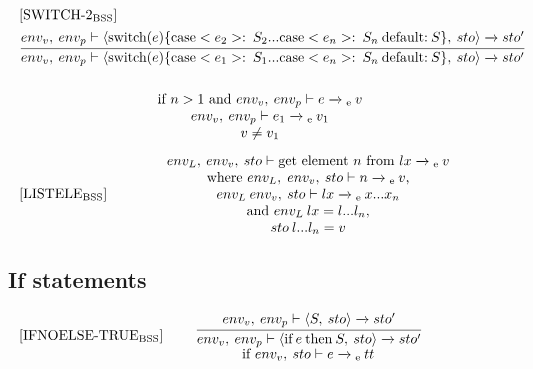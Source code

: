 \begin{equation}
\begin{split}
\begin{minipage}{\linewidth}
$[\text{SWITCH-2}_\text{BSS}]$
\end{minipage}
\\
\begin{minipage}{\linewidth}
\centering
$\cfrac
{
    env_v, \: env_p \vdash \langle  \text{switch}(e) \{\text{case} <e_2>: \: S_2 ... \text{case} <e_n>: \: S_n \: \text{default:} \: S\}, \: sto \rangle \xrightarrow{} sto'
}
{
    env_v, \: env_p \vdash \langle \text{switch}(e) \{\text{case} <e_1>: \: S_1 ... \text{case} <e_n>: \: S_n \: \text{default:} \: S\}, \: sto \rangle \xrightarrow{} sto' 
}$ 
\end{minipage}
\\\\
\begin{minipage}{\linewidth}
\centering
if $ n > 1$ and $env_v, \: env_p \vdash e \xrightarrow{}\textsubscript{e} \: v$
\\
$env_v, \: env_p \vdash e_1 \xrightarrow{}\textsubscript{e} \: v_1$
\\
$v \neq v_1$
\end{minipage}
\end{split}
\end{equation}

\begin{equation}
\begin{minipage}{.2\linewidth}
$[\text{LISTELE}_\text{BSS}]$
\end{minipage}
\begin{minipage}{.8\linewidth}
\centering
$env_L, \: env_v, \: sto \vdash \text{get element } n \text{ from } lx \xrightarrow{}\textsubscript{e} \: v$
\\
where $env_L, \; env_v, \: sto \vdash n \xrightarrow{}\textsubscript{e} \: v$, \\$env_L \: env_v, \: sto \vdash lx \xrightarrow{}\textsubscript{e} \: x...x_n$ 
\\and $env_L \: lx = l... l_n$, \\ $sto \: l...l_n = v$
\end{minipage}
\end{equation}


\subsection*{If statements}
\begin{equation}
\begin{minipage}{.2\linewidth}
$[\text{IFNOELSE-TRUE}_\text{BSS}]$
\end{minipage}
\begin{minipage}{.8\linewidth}
\centering
$\cfrac{env_v, \: env_p \vdash \langle S, \: sto\rangle \xrightarrow{} sto'}{env_v, \: env_p \vdash \langle \text{if} \: e \: \text{then} \: S, \: sto \rangle \xrightarrow{} sto'}$ 
\\
if $env_v, \: sto \vdash e \xrightarrow{}\textsubscript{e} \: tt$
\end{minipage}
\end{equation}

